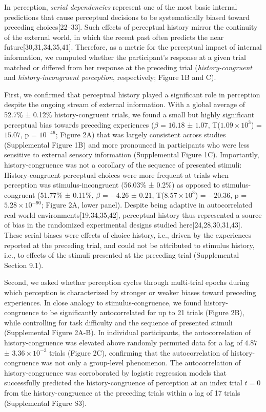 \documentclass[
]{article}
\begin{document}
In perception, \emph{serial dependencies} represent one of the most
basic internal predictions that cause perceptual decisions to be
systematically biased toward preceding choices{[}22--33{]}. Such effects
of perceptual history mirror the continuity of the external world, in
which the recent past often predicts the near
future{[}30,31,34,35,41{]}. Therefore, as a metric for the perceptual
impact of internal information, we computed whether the participant's
response at a given trial matched or differed from her response at the
preceding trial (\emph{history-congruent} and \emph{history-incongruent
perception}, respectively; Figure 1B and C).

First, we confirmed that perceptual history played a significant role in
perception despite the ongoing stream of external information. With a
global average of 52.7\% ± 0.12\% history-congruent trials, we found a
small but highly significant perceptual bias towards preceding
experiences (\(\beta\) = \(16.18\) ± \(1.07\),
T(\(\ensuremath{1.09\times 10^{3}}\)) = \(15.07\), p =
\(\ensuremath{10^{-46}}\); Figure 2A) that was largely consistent across
studies (Supplemental Figure 1B) and more pronounced in participants who
were less sensitive to external sensory information (Supplemental Figure
1C). Importantly, history-congruence was not a corollary of the sequence
of presented stimuli: History-congruent perceptual choices were more
frequent at trials when perception was stimulus-incongruent (56.03\% ±
0.2\%) as opposed to stimulus-congruent (51.77\% ± 0.11\%, \(\beta\) =
\(-4.26\) ± \(0.21\), T(\(\ensuremath{8.57\times 10^{3}}\)) =
\(-20.36\), p = \(\ensuremath{5.28\times 10^{-90}}\); Figure 2A, lower
panel). Despite being adaptive in autocorrelated real-world
environments{[}19,34,35,42{]}, perceptual history thus represented a
source of bias in the randomized experimental designs studied
here{[}24,28,30,31,43{]}. These serial biases were effects of choice
history, i.e., driven by the experiences reported at the preceding
trial, and could not be attributed to stimulus history, i.e., to effects
of the stimuli presented at the preceding trial (Supplemental Section
9.1).

Second, we asked whether perception cycles through multi-trial epochs
during which perception is characterized by stronger or weaker biases
toward preceding experiences. In close analogy to stimulus-congruence,
we found history-congruence to be significantly autocorrelated for up to
21 trials (Figure 2B), while controlling for task difficulty and the
sequence of presented stimuli (Supplemental Figure 2A-B). In individual
participants, the autocorrelation of history-congruence was elevated
above randomly permuted data for a lag of \(4.87\) ±
\(\ensuremath{3.36\times 10^{-3}}\) trials (Figure 2C), confirming that
the autocorrelation of history-congruence was not only a group-level
phenomenon. The autocorrelation of history-congruence was corroborated
by logistic regression models that successfully predicted the
history-congruence of perception at an index trial \(t = 0\) from the
history-congruence at the preceding trials within a lag of 17 trials
(Supplemental Figure S3).
\end{document}
